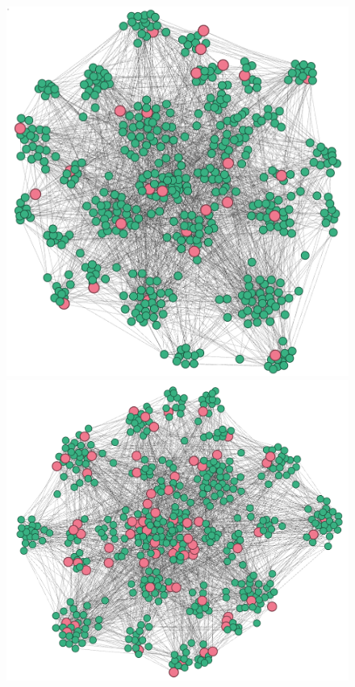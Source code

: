 \documentclass[11pt]{article}
\begin{document}
\begin{figure}[!htb]
\centering
\begin{minipage}{.3\linewidth}
    \centering
    \includegraphics[width=\linewidth]{figures/begin1992.png}
\end{minipage}%
\hfill%
\begin{minipage}{.3\linewidth}
    \centering
    \includegraphics[width=\linewidth]{figures/end2017.png}

\end{minipage}
\end{figure}
\end{document}
